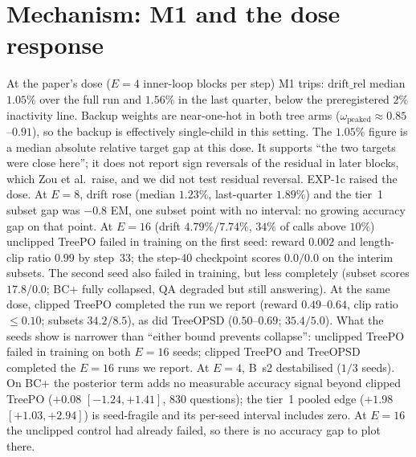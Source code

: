 \documentclass[11pt]{article}
\begin{document}
\section{Mechanism: M1 and the dose response}
\label{sec:mech}

At the paper's dose ($E=4$ inner-loop blocks per step) M1 trips:
$\mathrm{drift\_rel}$ median $1.05\%$ over the full run and $1.56\%$ in
the last quarter, below the preregistered $2\%$ inactivity line. Backup
weights are near-one-hot in both tree arms
($\omega_{\mathrm{peaked}} \approx 0.85$--$0.91$), so the backup is
effectively single-child in this setting. The $1.05\%$ figure is a median
absolute relative target gap at this dose. It supports ``the two targets
were close here''; it does not report sign reversals of the residual in
later blocks, which Zou et al.\ raise, and we did not test residual
reversal. EXP-1c raised the dose. At $E=8$, drift rose (median $1.23\%$,
last-quarter $1.89\%$) and the tier~1 subset gap was $-0.8$ EM, one subset
point with no interval: no growing accuracy gap on that point. At $E=16$
(drift $4.79\%/7.74\%$, $34\%$ of calls above $10\%$) unclipped TreePO
failed in training on the first seed: reward $0.002$ and length-clip ratio
$0.99$ by step~33; the step-40 checkpoint scores $0.0/0.0$ on the interim
subsets. The second seed also failed in training, but less completely
(subset scores $17.8/0.0$; BC+ fully collapsed, QA degraded but still
answering). At the same dose, clipped TreePO completed the run we report
(reward $0.49$--$0.64$, clip ratio $\leq 0.10$; subsets $34.2/8.5$), as
did TreeOPSD ($0.50$--$0.69$; $35.4/5.0$). What the seeds show is narrower
than ``either bound prevents collapse'': unclipped TreePO failed in
training on both $E{=}16$ seeds; clipped TreePO and TreeOPSD completed
the $E{=}16$ runs we report. At $E{=}4$, B~s2 destabilised
($1/3$ seeds). On BC+ the posterior term adds no measurable accuracy
signal beyond clipped TreePO ($+0.08$ $[-1.24, +1.41]$, 830 questions);
the tier~1 pooled edge ($+1.98$ $[+1.03, +2.94]$) is seed-fragile and
its per-seed interval includes zero. At $E{=}16$ the unclipped control
had already failed, so there is no accuracy gap to plot there.
\end{document}
